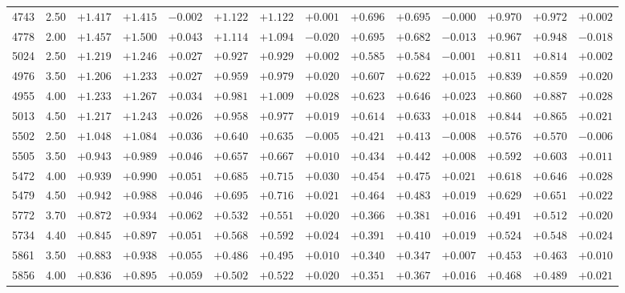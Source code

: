\documentclass[]{aa}
\begin{document}
\begin{appendix}
\begin{table*}
\begin{center}
\begin{tabular}{llllllllllllll}
4743  &2.50 & $+1.417$ & $+1.415$ & $-0.002$ & $+1.122$ & $+1.122$ & $+0.001$ & $+0.696$ & $+0.695$ & $-0.000$ & $+0.970 $& $+0.972$ & $+0.002$ \\
4778  &2.00 & $+1.457$ & $+1.500$ & $+0.043$ & $+1.114$ & $+1.094$ & $-0.020$ & $+0.695$ & $+0.682$ & $-0.013$ & $+0.967 $& $+0.948$ & $-0.018$ \\
5024  &2.50 & $+1.219$ & $+1.246$ & $+0.027$ & $+0.927$ & $+0.929$ & $+0.002$ & $+0.585$ & $+0.584$ & $-0.001$ & $+0.811 $& $+0.814$ & $+0.002$ \\
4976  &3.50 & $+1.206$ & $+1.233$ & $+0.027$ & $+0.959$ & $+0.979$ & $+0.020$ & $+0.607$ & $+0.622$ & $+0.015$ & $+0.839 $& $+0.859$ & $+0.020$ \\
4955  &4.00 & $+1.233$ & $+1.267$ & $+0.034$ & $+0.981$ & $+1.009$ & $+0.028$ & $+0.623$ & $+0.646$ & $+0.023$ & $+0.860 $& $+0.887$ & $+0.028$ \\
5013  &4.50 & $+1.217$ & $+1.243$ & $+0.026$ & $+0.958$ & $+0.977$ & $+0.019$ & $+0.614$ & $+0.633$ & $+0.018$ & $+0.844 $& $+0.865$ & $+0.021$ \\
5502  &2.50 & $+1.048$ & $+1.084$ & $+0.036$ & $+0.640$ & $+0.635$ & $-0.005$ & $+0.421$ & $+0.413$ & $-0.008$ & $+0.576 $& $+0.570$ & $-0.006$ \\
5505  &3.50 & $+0.943$ & $+0.989$ & $+0.046$ & $+0.657$ & $+0.667$ & $+0.010$ & $+0.434$ & $+0.442$ & $+0.008$ & $+0.592 $& $+0.603$ & $+0.011$ \\
5472  &4.00 & $+0.939$ & $+0.990$ & $+0.051$ & $+0.685$ & $+0.715$ & $+0.030$ & $+0.454$ & $+0.475$ & $+0.021$ & $+0.618 $& $+0.646$ & $+0.028$ \\
5479  &4.50 & $+0.942$ & $+0.988$ & $+0.046$ & $+0.695$ & $+0.716$ & $+0.021$ & $+0.464$ & $+0.483$ & $+0.019$ & $+0.629 $& $+0.651$ & $+0.022$ \\
5772  &3.70 & $+0.872$ & $+0.934$ & $+0.062$ & $+0.532$ & $+0.551$ & $+0.020$ & $+0.366$ & $+0.381$ & $+0.016$ & $+0.491 $& $+0.512$ & $+0.020$ \\
5734  &4.40 & $+0.845$ & $+0.897$ & $+0.051$ & $+0.568$ & $+0.592$ & $+0.024$ & $+0.391$ & $+0.410$ & $+0.019$ & $+0.524 $& $+0.548$ & $+0.024$ \\
5861  &3.50 & $+0.883$ & $+0.938$ & $+0.055$ & $+0.486$ & $+0.495$ & $+0.010$ & $+0.340$ & $+0.347$ & $+0.007$ & $+0.453 $& $+0.463$ & $+0.010$ \\
5856  &4.00 & $+0.836$ & $+0.895$ & $+0.059$ & $+0.502$ & $+0.522$ & $+0.020$ & $+0.351$ & $+0.367$ & $+0.016$ & $+0.468 $& $+0.489$ & $+0.021$ \\

\end{tabular}
\end{center}
\end{table*}
\end{appendix}
\end{document}
